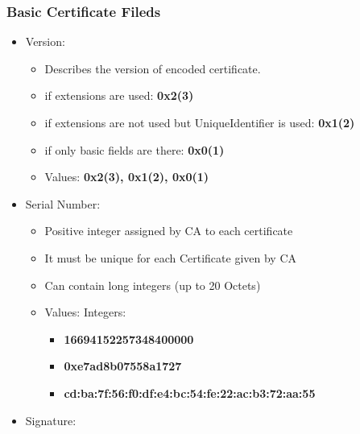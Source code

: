 \documentclass[a4paper]{article}
\begin{document}
    \subsubsection{Basic Certificate Fileds}
        \begin{itemize}
            \item Version:
                \begin{itemize}
                    \item Describes the version of encoded certificate.
                    \item if extensions are used: \textbf{0x2(3)}
                    \item if extensions are not used but UniqueIdentifier is used: \textbf{0x1(2)}
                    \item if only basic fields are there: \textbf{0x0(1)}
                \end{itemize}
                \begin{itemize}
                    \item Values: \textbf{0x2(3), 0x1(2), 0x0(1)}
                \end{itemize}
            \item Serial Number:
                \begin{itemize}
                    \item Positive integer assigned by CA to each certificate
                    \item It must be unique for each Certificate given by CA
                    \item Can contain long integers (up to 20 Octets)
                \end{itemize}
                \begin{itemize}
                    \item Values: Integers: 
                    \begin{itemize}
                        \item \textbf{16694152257348400000}
                        \item \textbf{0xe7ad8b07558a1727}
                        \item \textbf{cd:ba:7f:56:f0:df:e4:bc:54:fe:22:ac:b3:72:aa:55}
                    \end{itemize}
                \end{itemize}
            \item Signature:
                \begin{itemize}

\end{itemize}
\end{itemize}
\end{document}
